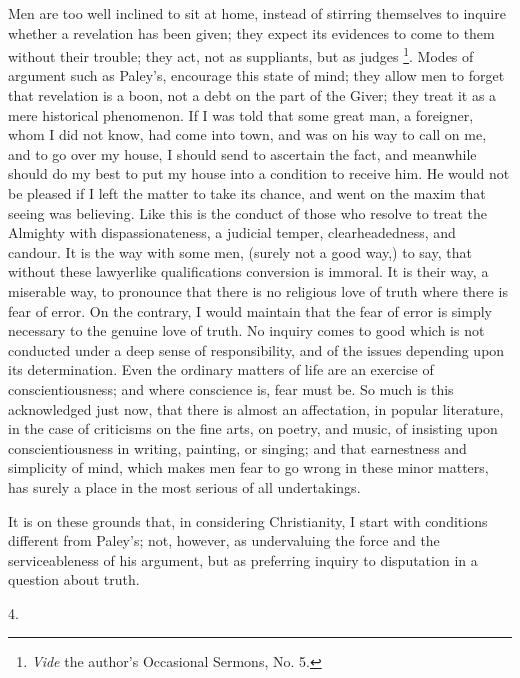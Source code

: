 Men are too well inclined to sit at home, instead of stirring
themselves to inquire whether a revelation has been given; they expect
its evidences to come to them without their trouble; they act, not as
suppliants, but as judges \footnote{\emph{Vide} the
author's Occasional Sermons, No. 5.}.
Modes of argument such as Paley's, encourage this state of mind; they
allow men to forget that revelation is a boon, not a debt on the part
of the Giver; they treat it as a mere historical phenomenon. If
I was told that some great man, a foreigner, whom I did not know, had
come into town, and was on his way to call on me, and to go over my
house, I should send to ascertain the fact, and meanwhile should do my
best to put my house into a condition to receive him. He would not be
pleased if I left the matter to take its chance, and went on the maxim
that seeing was believing. Like this is the conduct of those who
resolve to treat the Almighty with dispassionateness, a judicial
temper, clearheadedness, and candour. It is the way with some men,
(surely not a good way,) to say, that without these lawyerlike
qualifications conversion is immoral. It is their way, a miserable
way, to pronounce that there is no religious love of truth where there
is fear of error. On the contrary, I would maintain that the fear of
error is simply necessary to the genuine love of truth. No inquiry
comes to good which is not conducted under a deep sense of
responsibility, and of the issues depending upon its determination.
Even the ordinary matters of life are an exercise of
conscientiousness; and where conscience is, fear must be. So much is
this acknowledged just now, that there is almost an affectation, in
popular literature, in the case of criticisms on the fine arts, on
poetry, and music, of insisting upon conscientiousness in writing,
painting, or singing; and that earnestness and simplicity of mind,
which makes men fear to go wrong in these minor matters, has surely a
place in the most serious of all undertakings.

It is on these grounds that, in considering Christianity, I
start with conditions different from Paley's; not, however, as
undervaluing the force and the serviceableness of his argument, but as
preferring inquiry to disputation in a question about truth.

4.

